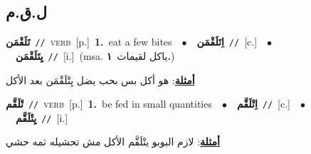 \documentclass[10pt,a4paper,twoside]{article} %
\begin{document}
\begin{multicols}{2}
\vspace{-3mm}
\subsection*{\color{blue}\foreignlanguage{arabic}{ل.ق.م}\color{blue}{}} 

{\setlength\topsep{0pt}\textbf{\foreignlanguage{arabic}{تَلَقْمَن}}\ {\color{gray}\texttt{//}\color{black}}\ \textsc{verb}\ [p.]\ \textbf{1.}~eat a few bites\ \ $\bullet$\ \ \setlength\topsep{0pt}\textbf{\foreignlanguage{arabic}{اِتَلَقْمَن}}\ {\color{gray}\texttt{//}\color{black}}\ [c.]\ \ $\bullet$\ \ \setlength\topsep{0pt}\textbf{\foreignlanguage{arabic}{يِتَلَقْمَن}}\ {\color{gray}\texttt{//}\color{black}}\ [i.]\ \color{gray}(msa. \foreignlanguage{arabic}{ياكل لقيمات}~\foreignlanguage{arabic}{\textbf{١.}})\color{black}\  \begin{flushright}\color{gray}\foreignlanguage{arabic}{\textbf{\underline{\foreignlanguage{arabic}{أمثلة}}}: هو أكل بس بحب يضل يِتْلَقْمَن بعد الأكل}\end{flushright}\color{black}} \vspace{2mm}

{\setlength\topsep{0pt}\textbf{\foreignlanguage{arabic}{تْلَقَّم}}\ {\color{gray}\texttt{//}\color{black}}\ \textsc{verb}\ [p.]\ \textbf{1.}~be fed in small quantities\ \ $\bullet$\ \ \setlength\topsep{0pt}\textbf{\foreignlanguage{arabic}{اِتْلَقَّم}}\ {\color{gray}\texttt{//}\color{black}}\ [c.]\ \ $\bullet$\ \ \setlength\topsep{0pt}\textbf{\foreignlanguage{arabic}{يِتْلَقَّم}}\ {\color{gray}\texttt{//}\color{black}}\ [i.]\  \begin{flushright}\color{gray}\foreignlanguage{arabic}{\textbf{\underline{\foreignlanguage{arabic}{أمثلة}}}: لازم البوبو يتْلَقَّم الأكل مش تحشيله ثمه حشي}\end{flushright}\color{black}} \vspace{2mm}


\end{multicols}
\end{document}
